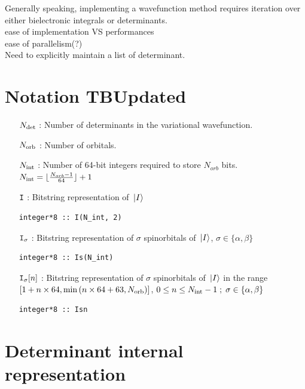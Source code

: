
Generally speaking, implementing a wavefunction method requires iteration over either bielectronic integrals or determinants. \\
ease of implementation VS performances \\
ease of parallelism(?) \\
Need to explicitly maintain a list of determinant. \\




\section{Notation TBUpdated}
\begin{itemize}
	\item [$N_\text{det}$] : Number of determinants in the variational wavefunction.
	
	\item [$N_\text{orb}$] : Number of orbitals.

	\item [$N_\text{int}$] : Number of 64-bit integers required to store $N_{orb}$ bits.
        $N_\text{int} = \lfloor \frac{N_{orb}-1}{64} \rfloor + 1$
		
	\item [$\texttt{I}$] : Bitstring representation of $\ket*{I}$
\begin{lstlisting}
integer*8 :: I(N_int, 2)
\end{lstlisting}
	
	\item [$\texttt{I}_\sigma$] : 
	Bitstring representation of $\sigma$ spinorbitals of $\ket*{I}$, $\sigma \in \{\alpha, \beta\}$ 
\begin{lstlisting}
integer*8 :: Is(N_int)
\end{lstlisting}

	\item [ {$\texttt{I}_\sigma [n] $} ] :
	Bitstring representation of $\sigma$ spinorbitals of $\ket*{I}$ in the range $[ 1+n \times 64, \min \qty (n \times 64 + 63, N_\text{orb}) ]$, $0 \leq n \leq N_\text{int}-1 \; ;\; \sigma \in \{\alpha, \beta\}$
\begin{lstlisting}
integer*8 :: Isn
\end{lstlisting}

\end{itemize}



\section{Determinant internal representation}

